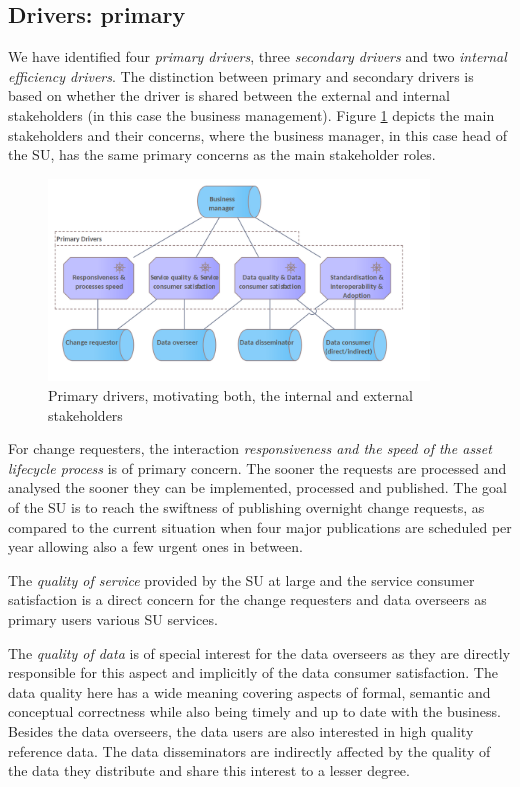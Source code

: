 	\subsection{Drivers: primary}
	
	We have identified four \textit{primary drivers}, three \textit{secondary drivers} and two \textit{internal efficiency drivers}. The distinction between primary and secondary drivers is based on whether the driver is shared between the external and internal stakeholders (in this case the business management).
	Figure \ref{fig:primary-drivers} depicts the main stakeholders and their concerns, where the business manager, in this case head of the SU, has the same primary concerns as the main stakeholder roles.
	
	\begin{figure}[hbt!]
		\centering
		\includegraphics[width=0.9\textwidth]{images/motivation/Primary drivers.png}
		\caption{Primary drivers, motivating both, the internal and external stakeholders}
		\label{fig:primary-drivers}
	\end{figure}
	
	For change requesters, the interaction \textit{responsiveness and the speed of the asset lifecycle process} is of primary concern. The sooner the requests are processed and analysed the sooner they can be implemented, processed and published. The goal of the SU is to reach the swiftness of publishing overnight change requests, as compared to the current situation when four major publications are scheduled per year allowing also a few urgent ones in between.
	
	The \textit{quality of service} provided by the SU at large and the service consumer satisfaction is a direct concern for the change requesters and data overseers as primary users various SU services. 
	
	The \textit{quality of data} is of special interest for the data overseers as they are directly responsible for this aspect and implicitly of the data consumer satisfaction. The data quality here has a wide meaning covering aspects of formal, semantic and conceptual correctness while also being timely and up to date with the business. Besides the data overseers, the data users are also interested in high quality reference data. The data disseminators are indirectly affected by the quality of the data they distribute and share this interest to a lesser degree. 
	
